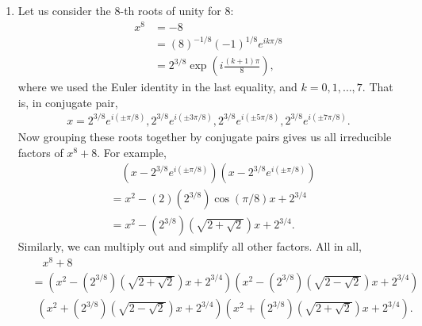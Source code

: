 \documentclass[11pt]{article}
\begin{document}
\begin{enumerate}[label=\text{A1.\arabic*}.]
\begin{enumerate}
\begin{proof}
                    All in all, no irreducible polynomials in $\R[x]$ has degree greater than 2.
                \end{proof}

            \item
                Let us consider the 8-th roots of unity for 8:
                \begin{align*}
                    x^8 &= -8 \\
                    &= \left(8\right)^{-1/8} \left(-1\right)^{1/8} e^{ik\pi/8} \\
                    &= 2^{3/8} \exp\left(i\frac{(k+1)\pi}{8}\right) \text{,}
                \end{align*}                
                where we used the Euler identity in the last equality, and $k = 0, 1, \dots, 7$. That is, in conjugate pair,
                \begin{align*}
                    x= 2^{3/8} e^{i(\pm \pi/8)}, 2^{3/8} e^{i(\pm 3\pi/8)}, 2^{3/8} e^{i(\pm 5\pi/8)}, 2^{3/8} e^{i(\pm 7\pi/8)} \text{.}
                \end{align*}
                Now grouping these roots together by conjugate pairs gives us all irreducible factors of $x^8 + 8$. For example,
                \begin{align*}
                    &\quad\left(x - 2^{3/8} e^{i(\pm \pi/8)}\right)\left(x- 2^{3/8} e^{i(\pm \pi/8)}\right) \\
                    &= x^2 - (2)\left(2^{3/8}\right)\cos\left(\pi/8\right) x + 2^{3/4} \\
                    &= x^2 - (2^{3/8})\left(\sqrt{2+\sqrt{2}}\right) x + 2^{3/4} \text{.}
                \end{align*}
                Similarly, we can multiply out and simplify all other factors. All in all,
                \begin{align*}
                    &\quad x^8 + 8 \\
                    &= \left(x^2 - (2^{3/8})\left(\sqrt{2+\sqrt{2}}\right) x + 2^{3/4} \right) \left(x^2 - (2^{3/8})\left(\sqrt{2-\sqrt{2}}\right) x + 2^{3/4} \right) \\
                    &\phantom{1}{\left(x^2 + (2^{3/8})\left(\sqrt{2-\sqrt{2}}\right) x + 2^{3/4} \right)}\left(x^2 + (2^{3/8})\left(\sqrt{2+\sqrt{2}}\right) x + 2^{3/4} \right) \text{.}
                \end{align*}

        \end{enumerate}


\end{enumerate}
\end{document}
